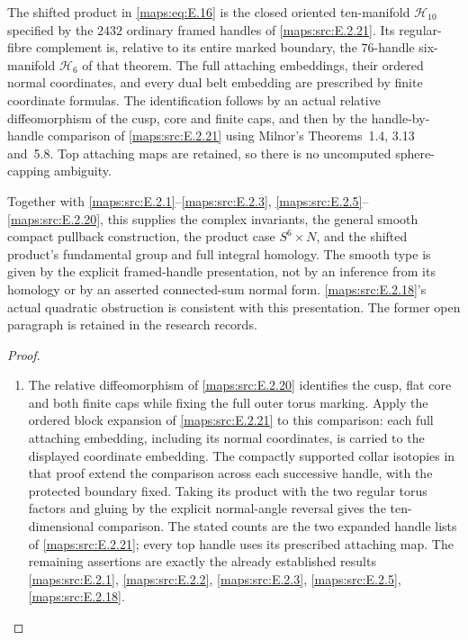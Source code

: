 \begin{proposition}\label{maps:src:E.2.4}


The shifted product in \eqref{maps:eq:E.16} is the closed oriented ten-manifold
$\mathcal H_{10}$ specified by the $2432$ ordinary framed handles
of \ref{maps:src:E.2.21}. Its regular-fibre complement is, relative to its entire
marked boundary, the $76$-handle six-manifold $\mathcal H_6$ of
that theorem. The full attaching embeddings, their ordered normal
coordinates, and every dual belt embedding are prescribed by
finite coordinate formulas. The identification follows by an
actual relative diffeomorphism of the cusp, core and finite caps,
and then by the handle-by-handle comparison of \ref{maps:src:E.2.21} using
Milnor's Theorems~1.4, 3.13 and~5.8. Top attaching maps are
retained, so there is no uncomputed sphere-capping ambiguity.

Together with \ref{maps:src:E.2.1}--\ref{maps:src:E.2.3}, \ref{maps:src:E.2.5}--\ref{maps:src:E.2.20}, this supplies the complex
invariants, the general smooth compact pullback construction,
the product case $S^6\times N$, and the shifted product's
fundamental group and full integral homology. The smooth type
is given by the explicit framed-handle presentation, not by an
inference from its homology or by an asserted connected-sum
normal form. \ref{maps:src:E.2.18}'s actual quadratic obstruction is consistent
with this presentation. The former open paragraph is retained
in the research records.


\end{proposition}
\begin{proof}
\begin{enumerate}[label=\arabic*.,leftmargin=*]
\item The relative diffeomorphism of \cref{maps:src:E.2.20} identifies the cusp, flat core and both finite caps while fixing the full outer torus marking. Apply the ordered block expansion of \cref{maps:src:E.2.21} to this comparison: each full attaching embedding, including its normal coordinates, is carried to the displayed coordinate embedding. The compactly supported collar isotopies in that proof extend the comparison across each successive handle, with the protected boundary fixed. Taking its product with the two regular torus factors and gluing by the explicit normal-angle reversal gives the ten-dimensional comparison. The stated counts are the two expanded handle lists of \cref{maps:src:E.2.21}; every top handle uses its prescribed attaching map. The remaining assertions are exactly the already established results \cref{maps:src:E.2.1}, \cref{maps:src:E.2.2}, \cref{maps:src:E.2.3}, \cref{maps:src:E.2.5}, \cref{maps:src:E.2.18}.
\end{enumerate}
\end{proof}



